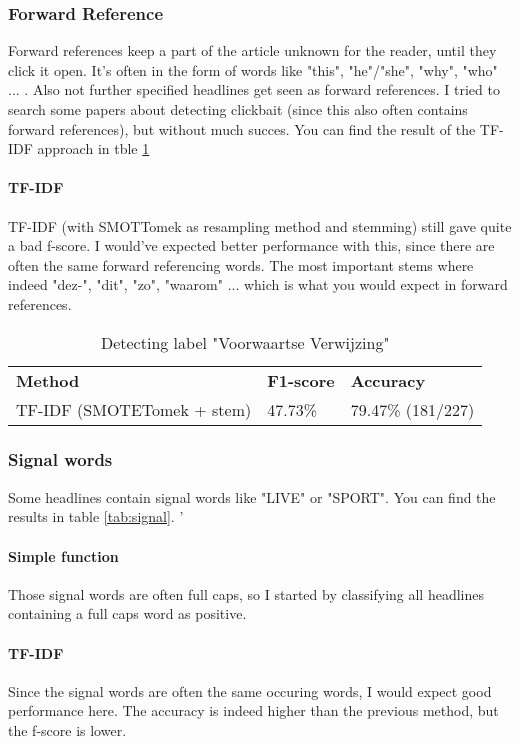 \documentclass{article}
\begin{document}
\subsubsection{Forward Reference}
Forward references keep a part of the article unknown for the reader, until they click it open. It's often in the form of words like "this", "he"/"she", "why", "who" ... . Also not further specified headlines get seen as forward references. \cite{soubry} I tried to search some papers about detecting clickbait (since this also often contains forward references), but without much succes. You can find the result of the TF-IDF approach in tble \ref{tab:forward}

\paragraph{TF-IDF} TF-IDF (with SMOTTomek as resampling method and stemming) still gave quite a bad f-score. I would've expected better performance with this, since there are often the same forward referencing words. The most important stems where indeed "dez-", "dit", "zo", "waarom" ... which is what you would expect in forward references.

\begin{table}
\begin{tabular}{lll}
\textbf{Method}                          & \textbf{F1-score} & \textbf{Accuracy} \\
TF-IDF (SMOTETomek + stem) & 47.73\%           & 79.47\% (181/227)
\end{tabular}
\caption{Detecting label "Voorwaartse Verwijzing"}
\label{tab:forward}
\end{table}

\subsubsection{Signal words}
Some headlines contain signal words like "LIVE" or "SPORT". \cite{soubry} You can find the results in table \ref{tab:signal}.
'
\paragraph{Simple function} Those signal words are often full caps, so I started by classifying all headlines containing a full caps word as positive.

\paragraph{TF-IDF} Since the signal words are often the same occuring words, I would expect good performance here. The accuracy is indeed higher than the previous method, but the f-score is lower.
\end{document}
